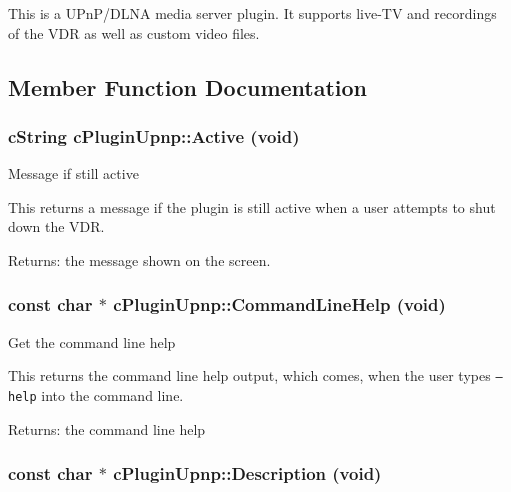 This is a UPnP/DLNA media server plugin. It supports live-TV and recordings of the VDR as well as custom video files. 

\subsection{Member Function Documentation}
\hypertarget{classcPluginUpnp_6b220cadefe502e7dfa4d70acea35083}{
\subsubsection[{Active}]{\setlength{\rightskip}{0pt plus 5cm}cString cPluginUpnp::Active (void)}}
\label{classcPluginUpnp_6b220cadefe502e7dfa4d70acea35083}


Message if still active

This returns a message if the plugin is still active when a user attempts to shut down the VDR.

\begin{Desc}
\item[Returns:]the message shown on the screen. \end{Desc}
\hypertarget{classcPluginUpnp_e2e63843aab64e06ce9b533f4893f7e0}{
\subsubsection[{CommandLineHelp}]{\setlength{\rightskip}{0pt plus 5cm}const char $\ast$ cPluginUpnp::CommandLineHelp (void)}}
\label{classcPluginUpnp_e2e63843aab64e06ce9b533f4893f7e0}


Get the command line help

This returns the command line help output, which comes, when the user types {\tt --help} into the command line.

\begin{Desc}
\item[Returns:]the command line help \end{Desc}
\hypertarget{classcPluginUpnp_6fc36c7fdf1f0deed776897725bcda9b}{
\subsubsection[{Description}]{\setlength{\rightskip}{0pt plus 5cm}const char $\ast$ cPluginUpnp::Description (void)}}
\label{classcPluginUpnp_6fc36c7fdf1f0deed776897725bcda9b}


